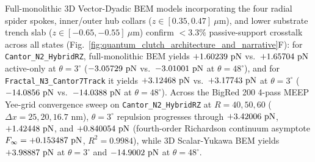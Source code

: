 \documentclass[11pt,letterpaper]{article}
\begin{document}
Full-monolithic 3D Vector-Dyadic BEM models incorporating the four radial spider spokes, inner/outer hub collars ($z \in [0.35, 0.47]\ \mu\text{m}$), and lower substrate trench slab ($z \in [-0.65, -0.55]\ \mu\text{m}$) confirm $<3.3\%$ passive-support crosstalk across all states (Fig.~\ref{fig:quantum_clutch_architecture_and_narrative}F): for \texttt{Cantor\_N2\_HybridRZ}, full-monolithic BEM yields $+1.60239{}\text{ pN}$ vs.\ $+1.65704{}\text{ pN}$ active-only at $\theta=3^\circ$ ($-3.05729{}\text{ pN}$ vs.\ $-3.01001{}\text{ pN}$ at $\theta=48^\circ$), and for \texttt{Fractal\_N3\_Cantor7Track} it yields $+3.12468{}\text{ pN}$ vs.\ $+3.17743{}\text{ pN}$ at $\theta=3^\circ$ ($-14.0856{}\text{ pN}$ vs.\ $-14.0388{}\text{ pN}$ at $\theta=48^\circ$). Across the BigRed 200 4-pass MEEP Yee-grid convergence sweep on \texttt{Cantor\_N2\_HybridRZ} at $R=40, 50, 60$ ($\Delta x = 25, 20, 16.7\text{ nm}$), $\theta=3^\circ$ repulsion progresses through $+3.42006{}\text{ pN}$, $+1.42448{}\text{ pN}$, and $+0.840054{}\text{ pN}$ (fourth-order Richardson continuum asymptote $F_\infty = +0.153487{}\text{ pN}$, $R^2 = 0.9984$), while 3D Scalar-Yukawa BEM yields $+3.98887{}\text{ pN}$ at $\theta=3^\circ$ and $-14.9002{}\text{ pN}$ at $\theta=48^\circ$.
\end{document}
